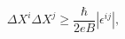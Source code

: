 \begin{equation}
\Delta X^{i}\Delta X^{j}\geq\frac{\hbar}{2eB}\left|  \epsilon^{ij}\right|
,\label{2.95}%
\end{equation}

